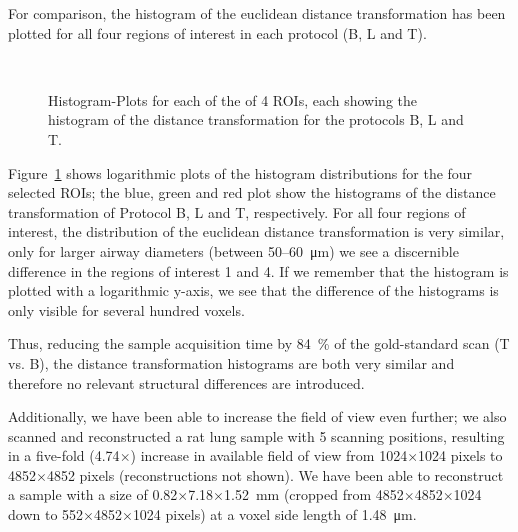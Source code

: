 For comparison, the histogram of the euclidean distance transformation has been plotted for all four regions of interest in each protocol (B, L and T).

\renewcommand{\imsize}{.5\columnwidth}
\begin{figure}
	\centering
	\caption{Histogram-Plots for each of the of 4 ROIs, each showing the histogram of the distance transformation for the protocols B, L and T.}%
	\ifiucr%
		\\%
	\else
	\fi	
	\label{fig:DTFplots}
\end{figure}

Figure~\ref{fig:DTFplots} shows logarithmic plots of the histogram distributions for the four selected ROIs; the blue, green and red plot show the histograms of the distance transformation of Protocol B, L and T, respectively. For all four regions of interest, the distribution of the euclidean distance transformation is very similar, only for larger airway diameters (between 50--\SI{60}{\micro\meter}) we see a discernible difference in the regions of interest 1 and 4. If we remember that the histogram is plotted with a logarithmic y-axis, we see that the difference of the histograms is only visible for several hundred voxels.

Thus, reducing the sample acquisition time by \SI{84}{\percent} of the gold-standard scan (T vs. B), the distance transformation histograms are both very similar and therefore no relevant structural differences are introduced.

Additionally, we have been able to increase the field of view even further; we also scanned and reconstructed a rat lung sample with 5 scanning positions, resulting in a five-fold (4.74$\times$) increase in available field of view %
%
 from 1024$\times$1024 pixels to 4852$\times$4852 pixels (reconstructions not shown). We have been able to reconstruct a sample with a size of 0.82$\times$7.18$\times$\SI{1.52}{\milli\meter} (cropped from 4852$\times$4852$\times$1024 down to 552$\times$4852$\times$1024 pixels) at a voxel side length of \SI{1.48}{\micro\meter}.